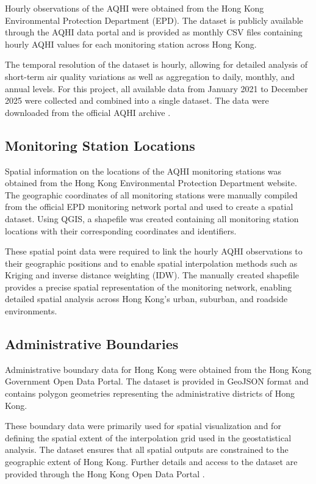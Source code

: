 \documentclass[manuscript,nonacm]{acmart}
\begin{document}
        Hourly observations of the AQHI were obtained from the Hong Kong Environmental Protection Department (EPD). The dataset is publicly available through the AQHI data portal and is provided as monthly CSV files containing hourly AQHI values for each monitoring station across Hong Kong.

        The temporal resolution of the dataset is hourly, allowing for detailed analysis of short-term air quality variations as well as aggregation to daily, monthly, and annual levels. For this project, all available data from January 2021 to December 2025 were collected and combined into a single dataset. The data were downloaded from the official AQHI archive \cite{hk_epd_past_aqhi}.

    \subsection{Monitoring Station Locations}

        Spatial information on the locations of the AQHI monitoring stations was obtained from the Hong Kong Environmental Protection Department website. The geographic coordinates of all monitoring stations were manually compiled from the official EPD monitoring network portal and used to create a spatial dataset. Using QGIS, a shapefile was created containing all monitoring station locations with their corresponding coordinates and identifiers.

        These spatial point data were required to link the hourly AQHI observations to their geographic positions and to enable spatial interpolation methods such as Kriging and inverse distance weighting (IDW). The manually created shapefile provides a precise spatial representation of the monitoring network, enabling detailed spatial analysis across Hong Kong's urban, suburban, and roadside environments.

    \subsection{Administrative Boundaries}

        Administrative boundary data for Hong Kong were obtained from the Hong Kong Government Open Data Portal. The dataset is provided in GeoJSON format and contains polygon geometries representing the administrative districts of Hong Kong.

        These boundary data were primarily used for spatial visualization and for defining the spatial extent of the interpolation grid used in the geostatistical analysis. The dataset ensures that all spatial outputs are constrained to the geographic extent of Hong Kong. Further details and access to the dataset are provided through the Hong Kong Open Data Portal \cite{hk_boundaries}.
\newpage
\end{document}
